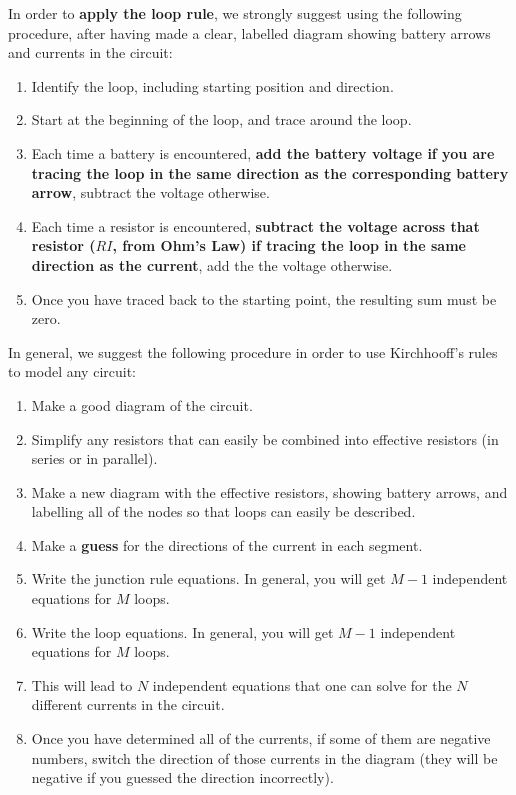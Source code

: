\begin{chapterSummary}
In order to \textbf{apply the loop rule}, we strongly suggest using the following procedure, after having made a clear, labelled diagram showing battery arrows and currents in the circuit:
\begin{enumerate}
\item Identify the loop, including starting position and direction.
\item Start at the beginning of the loop, and trace around the loop.
\item Each time a battery is encountered, \textbf{add the battery voltage if you are tracing the loop in the same direction as the corresponding battery arrow}, subtract the voltage otherwise.
\item Each time a resistor is encountered, \textbf{subtract the voltage across that resistor ($RI$, from Ohm's Law) if tracing the loop in the same direction as the current}, add the the voltage otherwise.
\item Once you have traced back to the starting point, the resulting sum must be zero.
\end{enumerate}

In general, we suggest the following procedure in order to use Kirchhooff's rules to model any circuit:
\begin{enumerate}
\item Make a good diagram of the circuit.
\item Simplify any resistors that can easily be combined into effective resistors (in series or in parallel).
\item Make a new diagram with the effective resistors, showing battery arrows, and labelling all of the nodes so that loops can easily be described.
\item Make a \textbf{guess} for the directions of the current in each segment.
\item Write the junction rule equations. In general, you will get $M-1$ independent equations for $M$ loops.
\item Write the loop equations. In general, you will get $M-1$ independent equations for $M$ loops.
\item This will lead to $N$ independent equations that one can solve for the $N$ different currents in the circuit.
\item Once you have determined all of the currents, if some of them are negative numbers, switch the direction of those currents in the diagram (they will be negative if you guessed the direction incorrectly).
\end{enumerate}


\end{chapterSummary}
